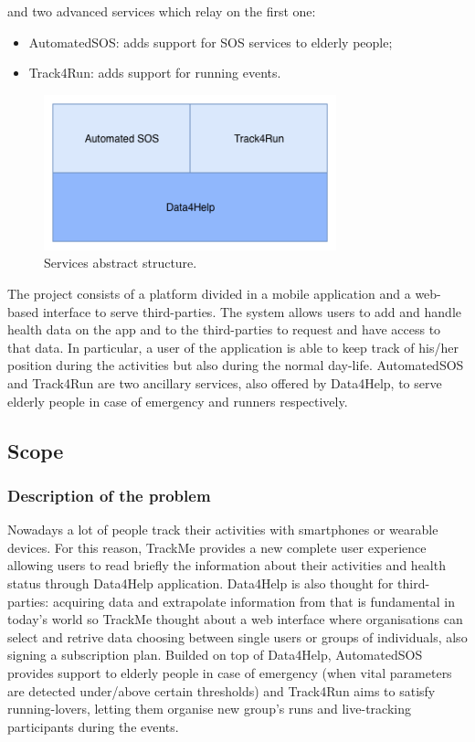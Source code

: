 \documentclass{article}
\begin{document}
and two advanced services which relay on the first one: 

\begin{itemize}
\item AutomatedSOS: adds support for SOS services to elderly people;
\item Track4Run: adds support for running events.
\end{itemize}

\begin{figure}[h!]
  \centering
  \includegraphics[height=4.5cm,keepaspectratio]{Figures/Services.png}
  \caption{Services abstract structure.}
\end{figure}

The project consists of a platform divided in a mobile application and 
a web-based interface to serve third-parties.
The system allows users to add and handle health data on the app
and to the third-parties to request and have access to that data.
In particular, a user of the application is able to keep track of 
his/her position during the activities but also during the normal 
day-life. 
AutomatedSOS and Track4Run are two ancillary services, also offered by
Data4Help, to serve elderly people in case of emergency and runners 
respectively.

\newpage
\subsection{Scope}
\subsubsection{Description of the problem}

Nowadays a lot of people track their activities with smartphones or
wearable devices. For this reason, TrackMe provides a new complete user 
experience allowing users to read briefly the information about their 
activities and health status through Data4Help application. 
Data4Help is also thought for third-parties: acquiring data and 
extrapolate information from that is fundamental in today's world so 
TrackMe thought about a web interface where organisations can select 
and retrive data choosing between single users or groups of individuals, 
also signing a subscription plan. 
Builded on top of Data4Help, AutomatedSOS provides support to elderly 
people in case of emergency (when vital parameters are detected 
under/above certain thresholds) and Track4Run aims to satisfy 
running-lovers, letting them organise new group's runs and live-tracking
participants during the events.
\end{document}
